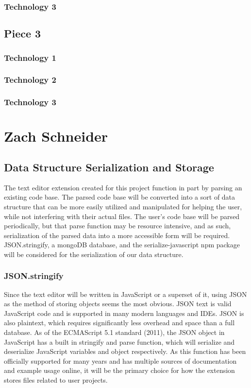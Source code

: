 \documentclass[letterpaper,10pt,titlepage,draftclsnofoot,onecolumn,onesided] {IEEEtran}
\begin{document}
\subsubsection{Technology 3}

\subsection{Piece 3}
\subsubsection{Technology 1}
\subsubsection{Technology 2}
\subsubsection{Technology 3}


\section{Zach Schneider}
\subsection{Data Structure Serialization and Storage}
The text editor extension created for this project function in part by parsing an existing code base. 
The parsed code base will be converted into a sort of data structure that can be more easily utilized and manipulated for helping the user, while not interfering with their actual files. 
The user's code base will be parsed periodically, but that parse function may be resource intensive, and as such, serialization of the parsed data into a more accessible form will be required. 
JSON.stringify, a mongoDB database, and the serialize-javascript npm package will be considered for the serialization of our data structure.
\\
\subsubsection{JSON.stringify}
Since the text editor will be written in JavaScript or a superset of it, using JSON as the method of storing objects seems the most obvious. 
JSON text is valid JavaScript code and is supported in many modern languages and IDEs. 
JSON is also plaintext, which requires significantly less overhead and space than a full database. 
As of the ECMAScript 5.1 standard (2011), the JSON object in JavaScript has a built in stringify and parse function, which will serialize and deserialize JavaScript variables and object respectively. 
As this function has been officially supported for many years and has multiple sources of documentation and example usage online, it will be the primary choice for how the extension stores files related to user projects. \cite{stringify}
\end{document}
